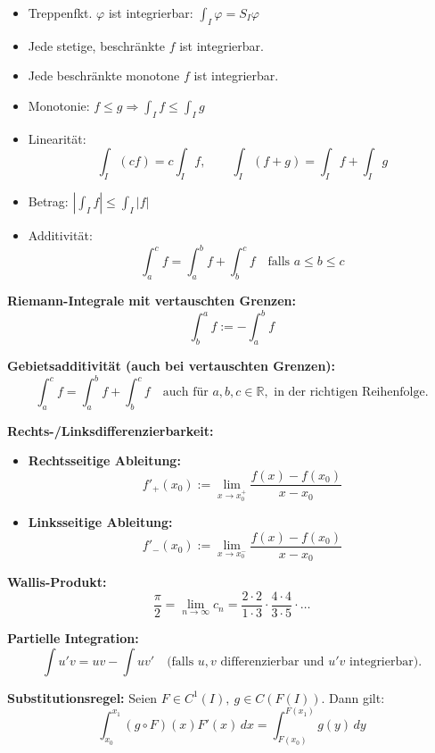\begin{itemize}
\begin{itemize}
  \item Treppenfkt. \( \varphi \) ist integrierbar: \( \int_I \varphi = S_I \varphi \)

  \item Jede stetige, beschränkte \( f \) ist integrierbar.

  \item Jede beschränkte monotone \( f \) ist integrierbar.

  \item Monotonie: \( f \le g \Rightarrow \int_I f \le \int_I g \)

  \item Linearität:
  \[
    \int_I (cf) = c \int_I f, \qquad \int_I (f+g) = \int_I f + \int_I g
  \]

  \item Betrag: \( \left| \int_I f \right| \le \int_I |f| \)

  \item Additivität:
  \[
    \int_a^c f = \int_a^b f + \int_b^c f \quad \text{falls } a \le b \le c
  \]
\end{itemize}

\textbf{Riemann-Integrale mit vertauschten Grenzen:}
\[
\int_b^a f := - \int_a^b f
\]

\textbf{Gebietsadditivität (auch bei vertauschten Grenzen):}
\[
\int_a^c f = \int_a^b f + \int_b^c f
\quad \text{auch für } a, b, c \in \mathbb{R}, \text{ in der richtigen Reihenfolge.}
\]

\textbf{Rechts-/Linksdifferenzierbarkeit:}
\begin{itemize}
  \item \textbf{Rechtsseitige Ableitung:}
  \[
  f'_{+}(x_0) := \lim_{x \to x_0^+} \frac{f(x) - f(x_0)}{x - x_0}
  \]
  \item \textbf{Linksseitige Ableitung:}
  \[
  f'_{-}(x_0) := \lim_{x \to x_0^-} \frac{f(x) - f(x_0)}{x - x_0}
  \]
\end{itemize}

\textbf{Wallis-Produkt:}
\[
\frac{\pi}{2} = \lim_{n \to \infty} c_n = \frac{2 \cdot 2}{1 \cdot 3} \cdot \frac{4 \cdot 4}{3 \cdot 5} \cdot \ldots
\]


\textbf{Partielle Integration:}
\[
\int u'v = uv - \int uv'
\quad \text{(falls } u,v \text{ differenzierbar und } u'v \text{ integrierbar).}
\]

\textbf{Substitutionsregel:} Seien $F \in C^1(I),\ g \in C(F(I))$. Dann gilt:
\[
\int_{x_0}^{x_1} (g \circ F)(x) F'(x)\, dx = \int_{F(x_0)}^{F(x_1)} g(y)\, dy
\]


\end{itemize}
